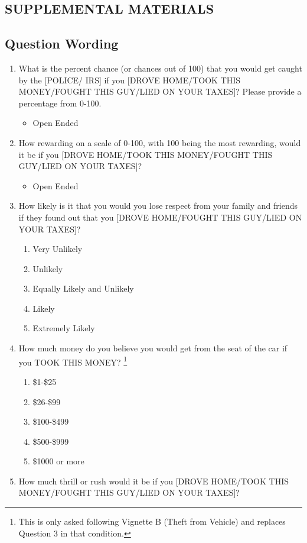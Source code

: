 \documentclass{article} %
\begin{document}
\begin{enumerate}[A]
{\section{SUPPLEMENTAL MATERIALS}

\subsection{Question Wording}

\begin{enumerate}
\item What is the percent chance (or chances out of 100) that you would get caught by the [POLICE/ IRS] if you [DROVE HOME/TOOK THIS MONEY/FOUGHT THIS GUY/LIED ON YOUR TAXES]? Please provide a percentage from 0-100. 
\begin{itemize}
\item Open Ended
\end{itemize}
\item How rewarding on a scale of 0-100, with 100 being the most rewarding, would it be if you [DROVE HOME/TOOK THIS MONEY/FOUGHT THIS GUY/LIED ON YOUR TAXES]?
\begin{itemize}
\item Open Ended
\end{itemize}
\item How likely is it that you would you lose respect from your family and friends if they found out that you [DROVE HOME/FOUGHT THIS GUY/LIED ON YOUR TAXES]?
\begin{enumerate}
\item Very Unlikely
\item Unlikely
\item Equally Likely and Unlikely
\item Likely
\item Extremely Likely
\end{enumerate}
\item How much money do you believe you would get from the seat of the car if you TOOK THIS MONEY?   \footnote{This is only asked following Vignette B (Theft from Vehicle) and replaces Question 3 in that condition.}
\begin{enumerate}
\item \$1-\$25
\item \$26-\$99
\item \$100-\$499
\item \$500-\$999
\item \$1000 or more
\end{enumerate}
\item How much thrill or rush would it be if you [DROVE HOME/TOOK THIS MONEY/FOUGHT THIS GUY/LIED ON YOUR TAXES]?

\end{enumerate}}
\end{enumerate}
\end{document}
